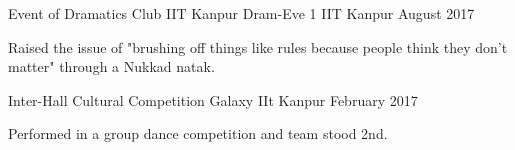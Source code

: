 \begin{cventries}
  \cventry
    {Event of Dramatics Club IIT Kanpur}
    {Dram-Eve 1}
    {IIT Kanpur}
    {August 2017}
    {
      \begin{cvitems}
        \item {Raised the issue of "brushing off things like rules because people think they don't matter" through a Nukkad natak.}
      \end{cvitems}
    }
  \cventry
    {Inter-Hall Cultural Competition}
    {Galaxy}
    {IIt Kanpur}
    {February 2017}
    {
      \begin{cvitems}
        \item {Performed in a group dance competition and team stood 2nd.}
      \end{cvitems}
    }
\end{cventries}

